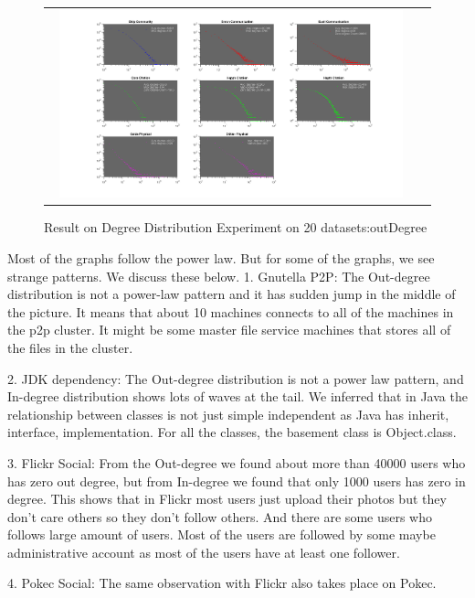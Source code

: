 \begin{figure}[H]
\begin{center}
\begin{tabular}{cc}
     \includegraphics[width=0.95\textwidth]{FIG/outdegree2.png}
\end{tabular}
\caption{Result on Degree Distribution Experiment on 20 datasets:outDegree}
\end{center}
\end{figure}

Most of the graphs follow the power law. But for some of the graphs, we see strange patterns. We discuss these below.
1. Gnutella P2P: The Out-degree distribution is not a power-law pattern and it has sudden jump in the middle of the picture. It means that about 10 machines connects to all of the machines in the p2p cluster. It might be some master file service machines that stores all of the files in the cluster.

2. JDK dependency: The Out-degree distribution is not a power law pattern, and In-degree distribution shows lots of waves at the tail. We inferred that in Java the relationship between classes is not just simple independent as Java has inherit, interface, implementation. For all the classes, the basement class is Object.class. 

3. Flickr Social: From the Out-degree we found about more than 40000 users who has zero out degree, but from In-degree we found that only 1000 users has zero in degree. This shows that in Flickr most users just upload their photos but they don't care others so they don't follow others. And there are some users who follows large amount of users. Most of the users are followed by some maybe administrative account as most of the users have at least one follower.

4. Pokec Social: The same observation with Flickr also takes place on Pokec.

